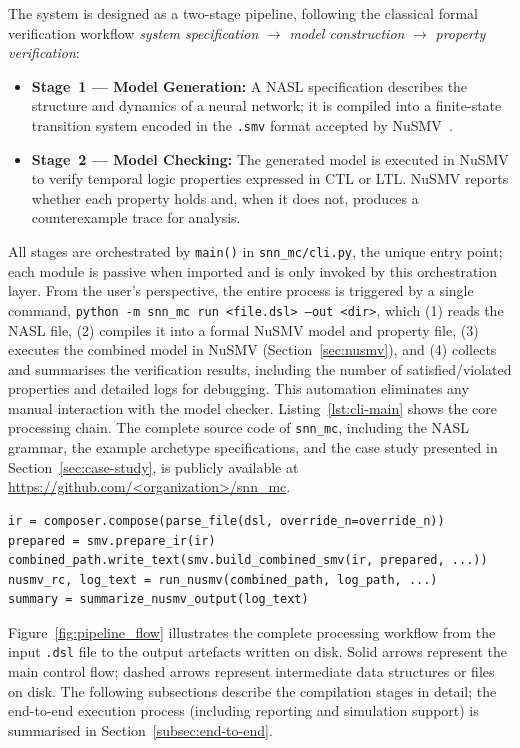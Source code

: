 \documentclass[
]{ceurart}
\begin{document}
The system is designed as a two-stage pipeline, following the classical
formal verification workflow \emph{system specification} $\rightarrow$
\emph{model construction} $\rightarrow$ \emph{property verification}:
\begin{itemize}
\item \textbf{Stage~1 --- Model Generation:} A \textsc{NASL} specification
      describes the structure and dynamics of a neural network; it is
      compiled into a finite-state transition system encoded in the
      \texttt{.smv} format accepted by NuSMV~\cite{Cimatti1999}.
\item \textbf{Stage~2 --- Model Checking:} The generated model is executed
      in NuSMV to verify temporal logic properties expressed in CTL or LTL.
      NuSMV reports whether each property holds and, when it does not,
      produces a counterexample trace for analysis.
\end{itemize}
All stages are orchestrated by \texttt{main()} in \texttt{snn\_mc/cli.py},
the unique entry point; each module is passive when imported and is only
invoked by this orchestration layer. From the user's perspective, the entire
process is triggered by a single command,
\texttt{python -m snn\_mc run <file.dsl> --out <dir>}, which (1) reads the
\textsc{NASL} file, (2) compiles it into a formal NuSMV model and property
file, (3) executes the combined model in NuSMV (Section~\ref{sec:nusmv}),
and (4) collects and summarises the verification results, including the
number of satisfied/violated properties and detailed logs for debugging.
This automation eliminates any manual interaction with the model checker.
Listing~\ref{lst:cli-main} shows the core processing chain.
The complete source code of \texttt{snn\_mc}, including the \textsc{NASL}
grammar, the example archetype specifications, and the case study presented
in Section~\ref{sec:case-study}, is publicly available at
\url{https://github.com/<organization>/snn_mc}.

\begin{lstlisting}[style=pythoncode,caption={Core orchestration in \texttt{snn\_mc/cli.py}.},label=lst:cli-main]
ir = composer.compose(parse_file(dsl, override_n=override_n))
prepared = smv.prepare_ir(ir)
combined_path.write_text(smv.build_combined_smv(ir, prepared, ...))
nusmv_rc, log_text = run_nusmv(combined_path, log_path, ...)
summary = summarize_nusmv_output(log_text)
\end{lstlisting}

Figure~\ref{fig:pipeline_flow} illustrates the complete processing workflow
from the input \texttt{.dsl} file to the output artefacts written on disk.
Solid arrows represent the main control flow; dashed arrows represent
intermediate data structures or files on disk. The following subsections
describe the compilation stages in detail; the end-to-end execution process
(including reporting and simulation support) is summarised in
Section~\ref{subsec:end-to-end}.
\end{document}
